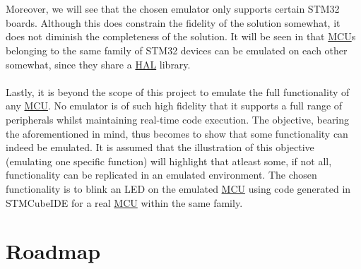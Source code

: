 \\\\
Moreover, we will see that the chosen emulator only supports certain STM32 boards. Although this does constrain the fidelity of the solution somewhat, it does not diminish the completeness of the solution. It will be seen in \textbf{} that \hyperref[listAbr]{MCU}s belonging to the same family of STM32 devices can be emulated on each other somewhat, since they share a \hyperref[listAbr]{HAL} library.
\\\\
Lastly, it is beyond the scope of this project to emulate the full functionality of any \hyperref[listAbr]{MCU}. No emulator is of such high fidelity that it supports a full range of peripherals whilst maintaining real-time code execution. The objective, bearing the aforementioned in mind, thus becomes to show that some functionality can indeed be emulated. It is assumed that the illustration of this objective (emulating one specific function) will highlight that atleast some, if not all, functionality can be replicated in an emulated environment. The chosen functionality is to blink an LED on the emulated \hyperref[listAbr]{MCU} using code generated in STMCubeIDE for a real \hyperref[listAbr]{MCU} within the same family. 

\section{Roadmap}
\label{rdmap}